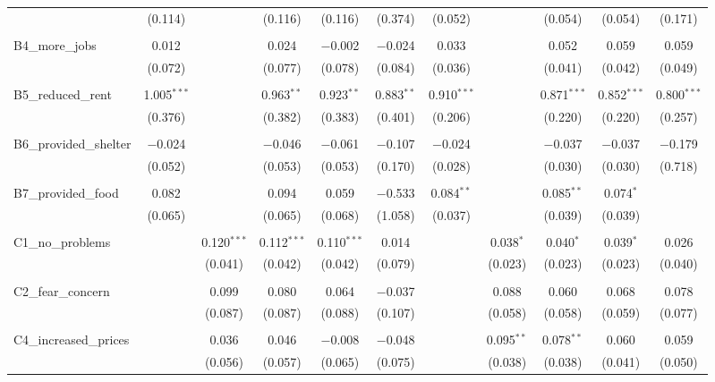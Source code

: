 \begin{table}[H]
\begin{tabular}{@{\extracolsep{4pt}}lcccccccccc}
  & (0.114) &  & (0.116) & (0.116) & (0.374) & (0.052) &  & (0.054) & (0.054) & (0.171) \\ 
  & & & & & & & & & & \\ 
 B4\_more\_jobs & 0.012 &  & 0.024 & $-$0.002 & $-$0.024 & 0.033 &  & 0.052 & 0.059 & 0.059 \\ 
  & (0.072) &  & (0.077) & (0.078) & (0.084) & (0.036) &  & (0.041) & (0.042) & (0.049) \\ 
  & & & & & & & & & & \\ 
 B5\_reduced\_rent & 1.005$^{***}$ &  & 0.963$^{**}$ & 0.923$^{**}$ & 0.883$^{**}$ & 0.910$^{***}$ &  & 0.871$^{***}$ & 0.852$^{***}$ & 0.800$^{***}$ \\ 
  & (0.376) &  & (0.382) & (0.383) & (0.401) & (0.206) &  & (0.220) & (0.220) & (0.257) \\ 
  & & & & & & & & & & \\ 
 B6\_provided\_shelter & $-$0.024 &  & $-$0.046 & $-$0.061 & $-$0.107 & $-$0.024 &  & $-$0.037 & $-$0.037 & $-$0.179 \\ 
  & (0.052) &  & (0.053) & (0.053) & (0.170) & (0.028) &  & (0.030) & (0.030) & (0.718) \\ 
  & & & & & & & & & & \\ 
 B7\_provided\_food & 0.082 &  & 0.094 & 0.059 & $-$0.533 & 0.084$^{**}$ &  & 0.085$^{**}$ & 0.074$^{*}$ &  \\ 
  & (0.065) &  & (0.065) & (0.068) & (1.058) & (0.037) &  & (0.039) & (0.039) &  \\ 
  & & & & & & & & & & \\ 
 C1\_no\_problems &  & 0.120$^{***}$ & 0.112$^{***}$ & 0.110$^{***}$ & 0.014 &  & 0.038$^{*}$ & 0.040$^{*}$ & 0.039$^{*}$ & 0.026 \\ 
  &  & (0.041) & (0.042) & (0.042) & (0.079) &  & (0.023) & (0.023) & (0.023) & (0.040) \\ 
  & & & & & & & & & & \\ 
 C2\_fear\_concern &  & 0.099 & 0.080 & 0.064 & $-$0.037 &  & 0.088 & 0.060 & 0.068 & 0.078 \\ 
  &  & (0.087) & (0.087) & (0.088) & (0.107) &  & (0.058) & (0.058) & (0.059) & (0.077) \\ 
  & & & & & & & & & & \\ 
 C4\_increased\_prices &  & 0.036 & 0.046 & $-$0.008 & $-$0.048 &  & 0.095$^{**}$ & 0.078$^{**}$ & 0.060 & 0.059 \\ 
  &  & (0.056) & (0.057) & (0.065) & (0.075) &  & (0.038) & (0.038) & (0.041) & (0.050) \\ 

\end{tabular}
\end{table}
